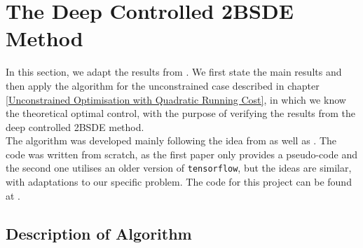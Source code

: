 \section{The Deep Controlled 2BSDE Method} \label{sec:2bsde}
In this section, we adapt the results from \cite{Deep_Learning_for_Constrained_Utility_Maximisation}. We first state the main results and then apply the algorithm for the unconstrained case described in chapter \ref{Unconstrained Optimisation with Quadratic Running Cost}, in which we know the theoretical optimal control, with the purpose of verifying the results from the deep controlled 2BSDE method. \\

The algorithm was developed mainly following the idea from \cite{Deep_Learning_for_Constrained_Utility_Maximisation} as well as \cite{Machine_Learning_Approximation_Algorithms}. The code was written from scratch, as the first paper only provides a pseudo-code and the second one utilises an older version of \verb|tensorflow|, but the ideas are similar, with adaptations to our specific problem. The code for this project can be found at \cite{kirev2023github}.


\subsection{Description of Algorithm}


